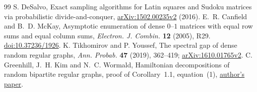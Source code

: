 \begin{thebibliography}{99}
S. DeSalvo, Exact sampling algorithms for Latin squares and Sudoku matrices
via probabilistic divide-and-conquer, \href{https://arxiv.org/abs/1502.00235v2}{arXiv:1502.00235v2} (2016).
E.~R. Canfield and B.~D. McKay, Asymptotic enumeration of dense
$0$--$1$ matrices with equal row sums and equal column sums,
\emph{Electron. J. Combin.} \textbf{12} (2005), R29.
\href{https://doi.org/10.37236/1926}{doi:10.37236/1926}.
K. Tikhomirov and P. Youssef, The spectral gap of dense random regular graphs,
\emph{Ann. Probab.} \textbf{47} (2019), 362--419;
\href{https://arxiv.org/abs/1610.01765v2}{arXiv:1610.01765v2}.
C. Greenhill, J.~H. Kim and N.~C. Wormald, Hamiltonian decompositions of random bipartite regular graphs, proof of Corollary~1.1, equation~(1), \href{https://users.monash.edu.au/~nwormald/papers/hambip.pdf}{author's paper}.
\end{thebibliography}
